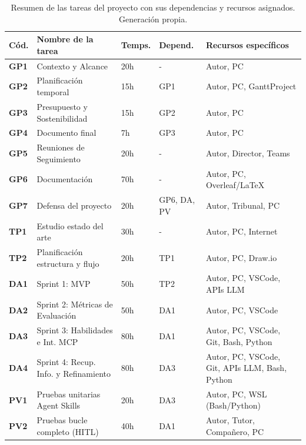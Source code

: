 \documentclass[11pt, letterpaper]{article}
\begin{document}
\begin{table}[H]
\centering
\begin{tabularx}{\textwidth}{
  >{\centering\arraybackslash}p{1.2cm}
  >{\raggedright\arraybackslash}X
  >{\centering\arraybackslash}p{1.5cm}
  >{\centering\arraybackslash}p{2.5cm}
  >{\raggedright\arraybackslash}p{3.8cm}
}
\toprule
\textbf{Cód.} & \textbf{Nombre de la tarea} & \textbf{Temps.} & \textbf{Depend.} & \textbf{Recursos específicos} \\
\midrule
\textbf{GP1} & Contexto y Alcance & 20h & - & Autor, PC \\
\textbf{GP2} & Planificación temporal & 15h & GP1 & Autor, PC, GanttProject \\
\textbf{GP3} & Presupuesto y Sostenibilidad & 15h & GP2 & Autor, PC \\
\textbf{GP4} & Documento final & 7h & GP3 & Autor, PC \\
\textbf{GP5} & Reuniones de Seguimiento & 20h & - & Autor, Director, Teams \\
\textbf{GP6} & Documentación & 70h & - & Autor, PC, Overleaf/LaTeX \\
\textbf{GP7} & Defensa del proyecto & 20h & GP6, DA, PV & Autor, Tribunal, PC \\
\midrule
\textbf{TP1} & Estudio estado del arte & 30h & - & Autor, PC, Internet \\
\textbf{TP2} & Planificación estructura y flujo & 20h & TP1 & Autor, PC, Draw.io \\
\midrule
\textbf{DA1} & Sprint 1: MVP & 50h & TP2 & Autor, PC, VSCode, APIs LLM \\
\textbf{DA2} & Sprint 2: Métricas de Evaluación & 50h & DA1 & Autor, PC, VSCode \\
\textbf{DA3} & Sprint 3: Habilidades e Int. MCP & 80h & DA1 & Autor, PC, VSCode, Git, Bash, Python \\
\textbf{DA4} & Sprint 4: Recup. Info. y Refinamiento & 80h & DA3 & Autor, PC, VSCode, Git, APIs LLM, Bash, Python \\
\midrule
\textbf{PV1} & Pruebas unitarias Agent Skills & 20h & DA3 & Autor, PC, WSL (Bash/Python) \\
\textbf{PV2} & Pruebas bucle completo (HITL) & 40h & DA1 & Autor, Tutor, Compañero, PC \\
\bottomrule
\end{tabularx}
\caption{Resumen de las tareas del proyecto con sus dependencias y recursos asignados. Generación propia.}
\label{tab:resumen_tareas}
\end{table}
\end{document}
